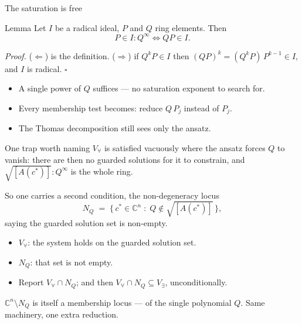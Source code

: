 \documentclass[10pt,aspectratio=169]{beamer}
\newcommand{\C}{\mathbb{C}}
\newcommand{\cstar}{c^{*}}
\begin{document}
\begin{frame}{The saturation is free}
\begin{block}{Lemma}
Let $I$ be a \alert{radical} ideal, $P$ and $Q$ ring elements. Then
\[
  P \in I : Q^{\infty} \iff QP \in I .
\]
\end{block}

\pause
\emph{Proof.} ($\Leftarrow$) is the definition. ($\Rightarrow$) if $Q^{k}P \in I$
then $(QP)^{k} = (Q^{k}P)\,P^{k-1} \in I$, and $I$ is radical. \hfill$\square$

\pause
\bigskip
\begin{itemize}
  \item A \alert{single} power of $Q$ suffices --- no saturation exponent to search
        for.
  \item Every membership test becomes: reduce $Q\,P_{j}$ instead of $P_{j}$.
  \item The Thomas decomposition still sees \alert{only the ansatz}.
\end{itemize}
\end{frame}

\begin{frame}{One trap worth naming}
$V_{\forall}$ is satisfied \alert{vacuously} where the ansatz forces $Q$ to
vanish: there are then no guarded solutions for it to constrain, and
$\sqrt{[A(\cstar)]} : Q^{\infty}$ is the whole ring.

\pause
\medskip
So one carries a second condition, the \alert{non-degeneracy locus}
\[
  N_{Q} \;=\; \{\, \cstar \in \C^{n} \;:\; Q \notin \sqrt{[A(\cstar)]} \,\},
\]
saying the guarded solution set is non-empty.

\pause
\medskip
\begin{itemize}
  \item $V_{\forall}$: the system holds on the guarded solution set.
  \item $N_{Q}$: that set is not empty.
  \item Report $V_{\forall} \cap N_{Q}$; and then
        $V_{\forall} \cap N_{Q} \subseteq V_{\exists}$, unconditionally.
\end{itemize}

\pause
\medskip
$\C^{n} \setminus N_{Q}$ is itself a membership locus --- of the single polynomial
$Q$. Same machinery, one extra reduction.
\end{frame}
\end{document}
